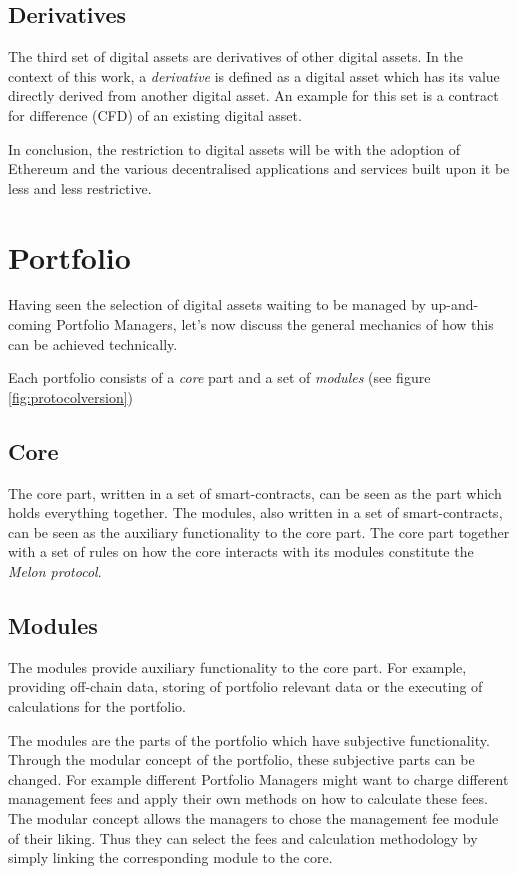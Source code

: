 \documentclass[9pt,oneside]{amsart}
\theoremstyle{plain}
\begin{document}
\begin{multicols}{2}
\subsection{Derivatives}\label{sub:derivatives}

The third set of digital assets are derivatives of other digital assets. In the context of this work, a \textit{derivative} is defined as a digital asset which has its value directly derived from another digital asset.
An example for this set is a contract for difference (CFD) of an existing digital asset.

In conclusion, the restriction to digital assets will be with the adoption of Ethereum and the various decentralised applications and services built upon it be less and less restrictive.

\section{Portfolio}\label{sec:portfolio}

Having seen the selection of digital assets waiting to be managed by up-and-coming Portfolio Managers, let's now discuss the general mechanics of how this can be achieved technically.

Each portfolio consists of a \textit{core} part and a set of \textit{modules} (see figure \ref{fig:protocolversion})

\subsection{Core}\label{sub:core}

The core part, written in a set of smart-contracts, can be seen as the part which holds everything together. The modules, also written in a set of smart-contracts, can be seen as the auxiliary functionality to the core part. The core part together with a set of rules on how the core interacts with its modules constitute the \textit{Melon protocol}.

\subsection{Modules}\label{sub:modules}

The modules provide auxiliary functionality to the core part. For example, providing off-chain data, storing of portfolio relevant data or the executing of calculations for the portfolio.

The modules are the parts of the portfolio which have subjective functionality. Through the modular concept of the portfolio, these subjective parts can be changed. For example different Portfolio Managers might want to charge different management fees and apply their own methods on how to calculate these fees. The modular concept allows the managers to chose the management fee module of their liking. Thus they can select the fees and calculation methodology by simply linking the corresponding module to the core.

\end{multicols}
\end{document}
